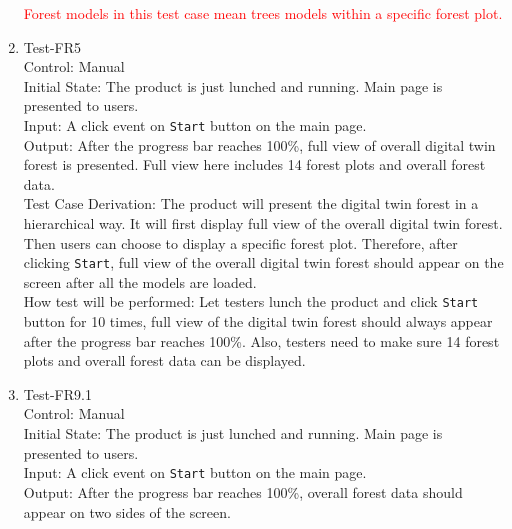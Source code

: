 \documentclass[12pt, titlepage]{article}
\begin{document}
\begin{enumerate}
\textcolor{red}{Forest models in this test case mean trees 
models within a specific forest plot.}

\item{Test-FR5\\}
Control: Manual\\ 

Initial State: The product is just lunched and running. Main page
is presented to users.\\

Input: A click event on \verb|Start| button on the main page.\\

Output: After the progress bar reaches 100\%, full view of overall digital 
twin forest is presented. Full view here includes 14 forest plots and overall forest
data. \\

Test Case Derivation: The product will present the digital twin forest in a 
hierarchical way. It will first display full view of the overall digital twin
forest. Then users can choose to display a specific forest plot. Therefore, after 
clicking \verb|Start|, full view of the overall digital twin forest should
appear on the screen after all the models are loaded. \\
					
How test will be performed: Let testers lunch the product and click \verb|Start| button
for 10 times, full view of the digital twin forest should always appear after the 
progress bar reaches 100\%. Also, testers need to make sure 14 forest plots and 
overall forest data can be displayed.


\item{Test-FR9.1\\}
Control: Manual\\ 

Initial State: The product is just lunched and running. Main 
page is presented to users.\\

Input: A click event on \verb|Start| button on the main page.\\

Output: After the progress bar reaches 100\%, overall forest data should appear on two
sides of the  screen. \\


\end{enumerate}
\end{document}
